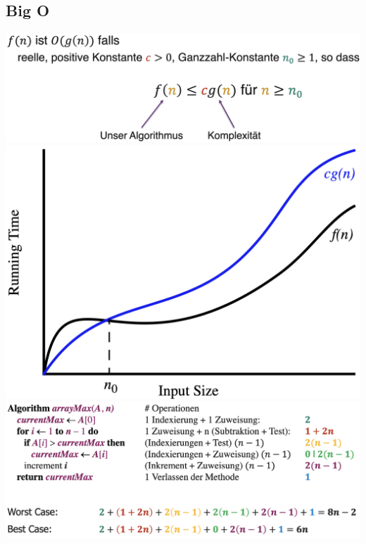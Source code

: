 

\newcommand{\SUBJECT}{}
\newcommand{\TITLE}{Cheat Sheet Objektorientierte Programmierung 2}



\begin{multicols*}{4}
    \setlength{\columnseprule}{0.2pt}
		\footnotesize

\section{Big O}

    \includegraphics[scale=0.15]{graphic/14_big_o_notation_herleitung}
	\newline
	\includegraphics[scale=0.15]{graphic/03_big_o_notation}
	\newline
	\includegraphics[scale=0.17]{graphic/04_primitive_operationen_zaehlen}


\end{multicols*}

